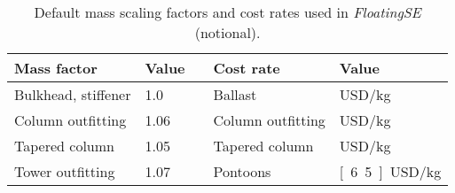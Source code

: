 \begin{table}[htbp]
  \begin{center}
    {\small
      \caption{Default mass scaling factors and cost rates used in
        \textit{FloatingSE} (notional).}
      \label{tbl:factors}
      \begin{tabular}{llcll}
        \textbf{Mass factor} & \textbf{Value} && \textbf{Cost rate} & \textbf{Value} \\
        \hline \hline
        Bulkhead, stiffener & 1.0 && Ballast & \unit[100]{USD/kg} \\
        Column outfitting & 1.06 && Column outfitting & \unit[6,980]{USD/kg} \\
        Tapered column & 1.05 && Tapered column & \unit[4,720]{USD/kg} \\
        Tower outfitting & 1.07 && Pontoons & \unit[6.5]{USD/kg} \\
        \hline
      \end{tabular}
    }
  \end{center}
\end{table}
